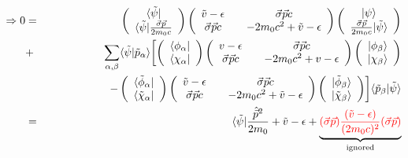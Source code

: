 \documentclass[11pt,a4paper]{report}
\begin{document}
\begin{eqnarray}
\Rightarrow
0&=&\left(\begin{array}{c}\langle\tilde{\psi}|\\
\langle\tilde{\psi}|\frac{\vec{\sigma}\vec{p}}{2m_0c}\end{array}\right)
\left(\begin{array}{cc}
\tilde{v}-\epsilon &\quad \vec{\sigma}\vec{p}c\\
\vec{\sigma}\vec{p}c &\quad -2m_0c^2+\tilde{v}-\epsilon\end{array}\right)
\left(\begin{array}{c}|\psi\rangle\\
\frac{\vec{\sigma}\vec{p}}{2m_0c}|\tilde{\psi}\rangle\end{array}\right)
\nonumber\\
&+&\sum_{\alpha,\beta}\langle\tilde{\psi}|\tilde{p}_\alpha\rangle
\biggl[
%
\left(\begin{array}{c}\langle\phi_\alpha|\\
\langle\chi_\alpha|
\end{array}\right)
\left(\begin{array}{cc}
v-\epsilon &\quad \vec{\sigma}\vec{p}c\\
\vec{\sigma}\vec{p}c &\quad -2m_0c^2+v-\epsilon\end{array}\right)
\left(\begin{array}{c}|\phi_\beta\rangle\\
|\chi_\beta\rangle\end{array}\right)
%
\nonumber\\
&&\hspace{2cm}-\left(\begin{array}{c}\langle\tilde{\phi}_\alpha|\\
\langle\tilde{\chi}_\alpha|
\end{array}\right)
\left(\begin{array}{cc}
\tilde{v}-\epsilon &\quad \vec{\sigma}\vec{p}c\\
\vec{\sigma}\vec{p}c &\quad -2m_0c^2+\tilde{v}-\epsilon\end{array}\right)
\left(\begin{array}{c}|\tilde{\phi}_\beta\rangle\\
|\tilde{\chi}_\beta\rangle\end{array}\right)
%
\biggr]
\langle\tilde{p}_\beta|\tilde{\psi}\rangle
\nonumber\\
%
&=&\langle\tilde\psi|
\frac{\hat{\vec{p}}^2}{2m_0}+\tilde{v}-\epsilon
+
\underbrace{
\textcolor{red}{(\vec{\sigma}\vec{p})\frac{(\tilde{v}-\epsilon)}{(2m_0c)^2}(\vec{\sigma}\vec{p})}}_{\textrm{ignored}}

\end{eqnarray}
\end{document}
